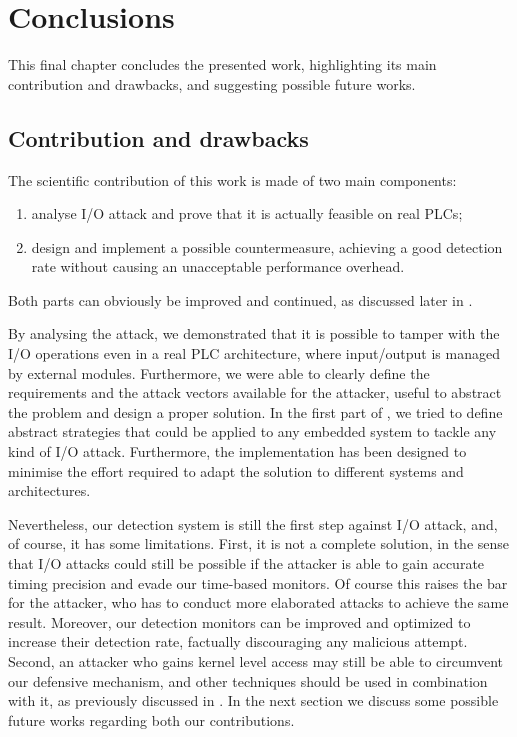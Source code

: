\chapter{Conclusions}
\label{chap:conclusions}

This final chapter concludes the presented work, highlighting its main contribution and drawbacks, and suggesting possible future works.


\section{Contribution and drawbacks}
\label{sec:contrib}

The scientific contribution of this work is made of two main components:
\begin{enumerate}
	\item analyse I/O attack and prove that it is actually feasible on real PLCs;
	\item design and implement a possible countermeasure, achieving a good detection rate without causing an unacceptable performance overhead.
\end{enumerate}
Both parts can obviously be improved and continued, as discussed later in .

By analysing the attack, we demonstrated that it is possible to tamper with the I/O operations even in a real PLC architecture, where input/output is managed by external modules.
Furthermore, we were able to clearly define the requirements and the attack vectors available for the attacker, useful to abstract the problem and design a proper solution.
In the first part of , we tried to define abstract strategies that could be applied to any embedded system to tackle any kind of I/O attack.
Furthermore, the implementation has been designed to minimise the effort required to adapt the solution to different systems and architectures.

Nevertheless, our detection system is still the first step against I/O attack, and, of course, it has some limitations.
First, it is not a complete solution, in the sense that I/O attacks could still be possible if the attacker is able to gain accurate timing precision and evade our time-based monitors.
Of course this raises the bar for the attacker, who has to conduct more elaborated attacks to achieve the same result.
Moreover, our detection monitors can be improved and optimized to increase their detection rate, factually discouraging any malicious attempt.
Second, an attacker who gains kernel level access may still be able to circumvent our defensive mechanism, and other techniques should be used in combination with it,
as previously discussed in . In the next section we discuss some possible future works regarding both our contributions.


